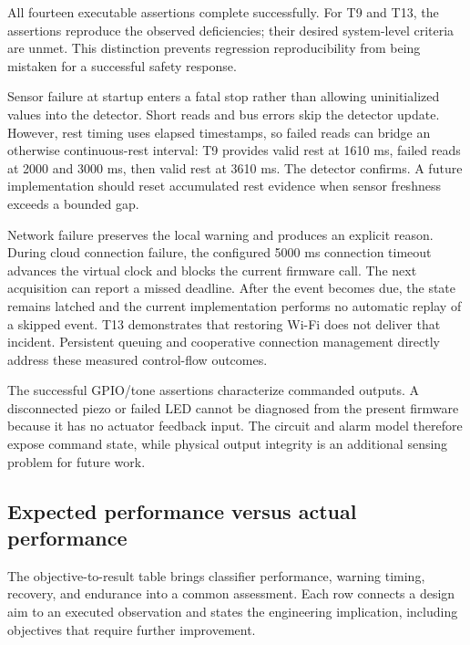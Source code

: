 \documentclass[10pt,a4paper]{article}
\begin{document}
\normalsize
All fourteen executable assertions complete successfully. For T9 and T13, the assertions reproduce the observed deficiencies; their desired system-level criteria are unmet. This distinction prevents regression reproducibility from being mistaken for a successful safety response.

Sensor failure at startup enters a fatal stop rather than allowing uninitialized values into the detector. Short reads and bus errors skip the detector update. However, rest timing uses elapsed timestamps, so failed reads can bridge an otherwise continuous-rest interval: T9 provides valid rest at 1610 ms, failed reads at 2000 and 3000 ms, then valid rest at 3610 ms. The detector confirms. A future implementation should reset accumulated rest evidence when sensor freshness exceeds a bounded gap.

Network failure preserves the local warning and produces an explicit reason. During cloud connection failure, the configured 5000 ms connection timeout advances the virtual clock and blocks the current firmware call. The next acquisition can report a missed deadline. After the event becomes due, the state remains latched and the current implementation performs no automatic replay of a skipped event. T13 demonstrates that restoring Wi-Fi does not deliver that incident. Persistent queuing and cooperative connection management directly address these measured control-flow outcomes.

The successful GPIO/tone assertions characterize commanded outputs. A disconnected piezo or failed LED cannot be diagnosed from the present firmware because it has no actuator feedback input. The circuit and alarm model therefore expose command state, while physical output integrity is an additional sensing problem for future work.

\subsection{Expected performance versus actual performance}
The objective-to-result table brings classifier performance, warning timing, recovery, and endurance into a common assessment. Each row connects a design aim to an executed observation and states the engineering implication, including objectives that require further improvement.
\end{document}
